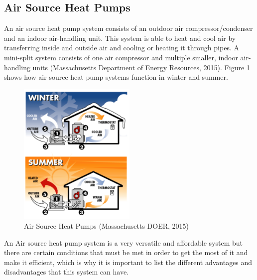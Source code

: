     \subsection{Air Source Heat Pumps}
    \par An air source heat pump system consists of an outdoor air compressor/condenser and an indoor air-handling unit. This system is able to heat and cool air by transferring inside and outside air and cooling or heating it through pipes. A mini-split system consists of one air compressor and multiple smaller, indoor air-handling units (Massachusetts Department of Energy Resources, 2015). Figure \ref{fig:ashp} shows how air source heat pump systems function in winter and summer.
    \begin{figure}[h]
      \centering
        \includegraphics[width=0.5\textwidth]{images/06-AirSourceHeatPump}
      \caption{Air Source Heat Pumps (Massachusetts DOER, 2015)}
      \label{fig:ashp}
    \end{figure}
    \par An Air source heat pump system is a very versatile and affordable system but there are certain conditions that must be met in order to get the most of it and make it efficient, which is why it is important to list the different advantages and disadvantages that this system can have.\\
    
